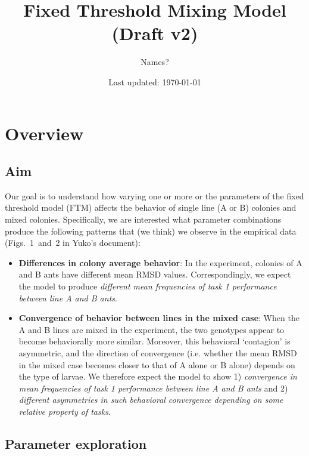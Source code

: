 \documentclass[11pt]{article}
\title{Fixed Threshold Mixing Model ({\color{red}Draft v2})}
\author{Names?}
\date{Last updated: \today}
\begin{document}
\maketitle
\tableofcontents

\newpage
\section{Overview}

\subsection{Aim}
Our goal is to understand how varying one or more or the parameters of the fixed threshold model (FTM) affects the behavior of single line (A or B) colonies and mixed colonies. Specifically, we are interested what parameter combinations produce the following patterns that (we think) we observe in the empirical data (Figs.~1~and~2 in Yuko's document):

\begin{itemize}
    \item \textbf{Differences in colony average behavior}: 
    In the experiment, colonies of A and B ants have different mean RMSD values. Correspondingly, we expect the model to produce \textit{different mean frequencies of task 1 performance between line A and B ants}.

    \item \textbf{Convergence of behavior between lines in the mixed case}:
    When the A and B lines are mixed in the experiment, the two genotypes appear to become behaviorally more similar. Moreover, this behavioral `contagion' is asymmetric, and the direction of convergence (i.e. whether the mean RMSD in the mixed case becomes closer to that of A alone or B alone) depends on the type of larvae. We therefore expect the model to show 1) \textit{convergence in mean frequencies of task 1 performance between line A and B ants} and 2) \textit{different asymmetries in such behavioral convergence depending on some relative property of tasks}.
    
\end{itemize}


\subsection{Parameter exploration}
\end{document}
